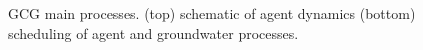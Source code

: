 \documentclass[12pt, a4paper]{article}
\begin{document}
\begin{figure}
	\caption{GCG main processes. (top) schematic of agent dynamics (bottom) scheduling of agent and groundwater processes.}\label{Fig: CH3_GCG1_Flow diagram agent processes}
	\begin{center}

	\end{center}
\end{figure}
\end{document}
